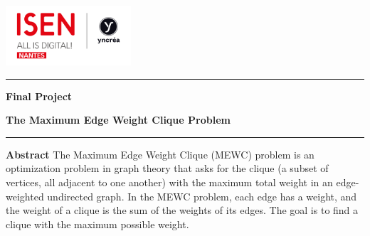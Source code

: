 
\begin{center}
    \includegraphics[width=0.35\textwidth]{image/ISEN.png}\\
\end{center}
    \rule{\linewidth}{0.5mm}
        
    \begin{center}
        {\Huge \bf Final Project}
    \end{center}
    
    \begin{center}
        {\LARGE \bf The Maximum Edge Weight Clique Problem}
    \end{center}
    \rule{\linewidth}{0.5mm}
    
    \vspace{1\baselineskip}
    
    \begin{center}
    \end{center}
    \vspace{1\baselineskip}   
    \large \textbf{Abstract} The Maximum Edge Weight Clique (MEWC) problem is an optimization problem in graph theory that asks for the clique (a subset of vertices, all adjacent to one another) with the maximum total weight in an edge-weighted undirected graph. In the MEWC problem, each edge has a weight, and the weight of a clique is the sum of the weights of its edges. The goal is to find a clique with the maximum possible weight. 

